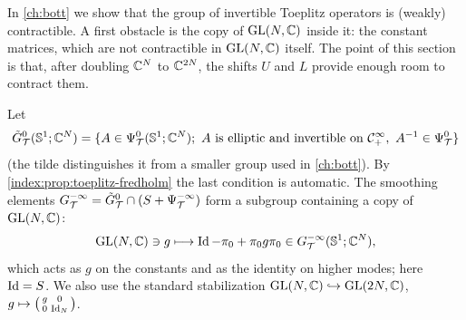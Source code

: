 In \cref{ch:bott} we show that the group of invertible Toeplitz operators is
(weakly) contractible. A first obstacle is the copy of $\operatorname{GL}(N,\mathbb{C})$ inside it:
the constant matrices, which are not contractible in $\operatorname{GL}(N,\mathbb{C})$ itself. The
point of this section is that, after doubling $\mathbb{C}^N$ to $\mathbb{C}^{2N}$, the shifts
$U$ and $L$ provide enough room to contract them.

Let
\begin{equation*}
  \tilde G^0_{\mathcal T}(\Sphere^1;\C^N)=\{A\in\PsiT0(\Sphere^1;\C^N);\
  A\text{ is elliptic and invertible on }\Hardy,\ A^{-1}\in\PsiT0\}
\end{equation*}
(the tilde distinguishes it from a smaller group used in \cref{ch:bott}). By
\cref{index:prop:toeplitz-fredholm} the last condition is automatic. The
smoothing elements $G^{-\infty}_{\mathcal T}=\tilde G^0_{\mathcal
T}\cap(S+\Psi^{-\infty}_{\mathcal T})$ form a subgroup containing a copy of $\operatorname{GL}(N,\mathbb{C})$:
\begin{equation}\label{index:eq:GL-embed}
  \operatorname{GL}(N,\mathbb{C})\ni g\longmapsto\operatorname{Id}-\pi_0+\pi_0g\pi_0\in
  G^{-\infty}_{\mathcal T}(\mathbb{S}^1;\mathbb{C}^N),
\end{equation}
which acts as $g$ on the constants and as the identity on higher modes; here
$\operatorname{Id}=S$. We also use the standard stabilization
$\operatorname{GL}(N,\mathbb{C})\hookrightarrow\operatorname{GL}(2N,\mathbb{C})$,
$g\mapsto\left(\begin{smallmatrix}g&0\\0&\operatorname{Id}_N\end{smallmatrix}\right)$.

